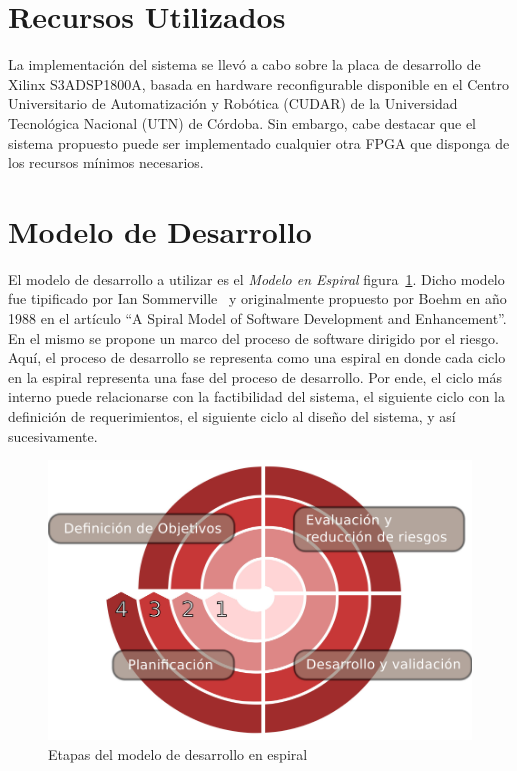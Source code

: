 \section{Recursos Utilizados}

La implementación del sistema se llevó a cabo sobre la placa de
desarrollo de Xilinx S3ADSP1800A, basada en hardware reconfigurable disponible en
el Centro Universitario de Automatización y Robótica (CUDAR) de la
Universidad Tecnológica Nacional (UTN) de Córdoba. Sin embargo, cabe
destacar que el sistema propuesto puede ser implementado cualquier
otra FPGA que disponga de los recursos mínimos necesarios.

\section{Modelo de Desarrollo}
El modelo de desarrollo a utilizar es el \textit{Modelo en
  Espiral} figura~\ref{fig:pepe}. Dicho modelo fue tipificado por Ian
Sommerville~\cite{Etiqueta00} y originalmente propuesto por Boehm en
año 1988 en el artículo ``A Spiral Model of Software Development and
Enhancement''. En el mismo se propone un marco del proceso de software
dirigido por el riesgo. Aquí, el proceso de desarrollo se representa
como una espiral en donde cada ciclo en la espiral representa una fase
del proceso de desarrollo. Por ende, el ciclo más interno puede
relacionarse con la factibilidad del sistema, el siguiente ciclo con
la definición de requerimientos, el siguiente ciclo al diseño del
sistema, y así sucesivamente.

\begin{figure}[h!]
 \begin{center}
  \includegraphics[width=1\textwidth,keepaspectratio=true]{./images/espiral.pdf}
  \caption{Etapas del modelo de desarrollo en espiral}
  \label{fig:pepe}
 \end{center}
\end{figure}

